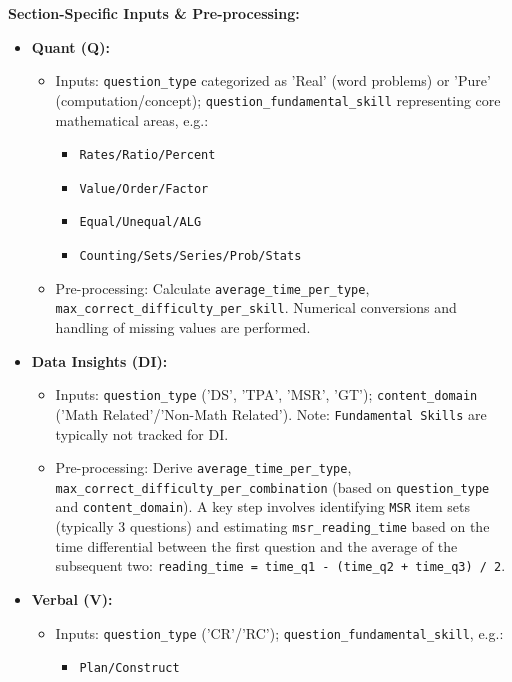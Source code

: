 \documentclass{article}
\begin{document}
\textbf{Section-Specific Inputs \& Pre-processing:}
\begin{itemize}
    \item \textbf{Quant (Q):}
    \begin{itemize}
        \item Inputs: \texttt{question\_type} categorized as 'Real' (word problems) or 'Pure' (computation/concept); \texttt{question\_fundamental\_skill} representing core mathematical areas, e.g.:
            \begin{itemize}
                \item \texttt{Rates/Ratio/Percent}
                \item \texttt{Value/Order/Factor}
                \item \texttt{Equal/Unequal/ALG}
                \item \texttt{Counting/Sets/Series/Prob/Stats}
            \end{itemize}
        \item Pre-processing: Calculate \texttt{average\_time\_per\_type}, \texttt{max\_correct\_difficulty\_per\_skill}. Numerical conversions and handling of missing values are performed.
    \end{itemize}
    \item \textbf{Data Insights (DI):}
    \begin{itemize}
        \item Inputs: \texttt{question\_type} ('DS', 'TPA', 'MSR', 'GT'); \texttt{content\_domain} ('Math Related'/'Non-Math Related'). Note: \texttt{Fundamental Skills} are typically not tracked for DI.
        \item Pre-processing: Derive \texttt{average\_time\_per\_type}, \texttt{max\_correct\_difficulty\_per\_combination} (based on \texttt{question\_type} and \texttt{content\_domain}). A key step involves identifying \texttt{MSR} item sets (typically 3 questions) and estimating \texttt{msr\_reading\_time} based on the time differential between the first question and the average of the subsequent two: \texttt{reading\_time = time\_q1 - (time\_q2 + time\_q3) / 2}.
    \end{itemize}
    \item \textbf{Verbal (V):}
    \begin{itemize}
        \item Inputs: \texttt{question\_type} ('CR'/'RC'); \texttt{question\_fundamental\_skill}, e.g.:
            \begin{itemize}
                \item \texttt{Plan/Construct}

\end{itemize}
\end{itemize}
\end{itemize}
\end{document}
